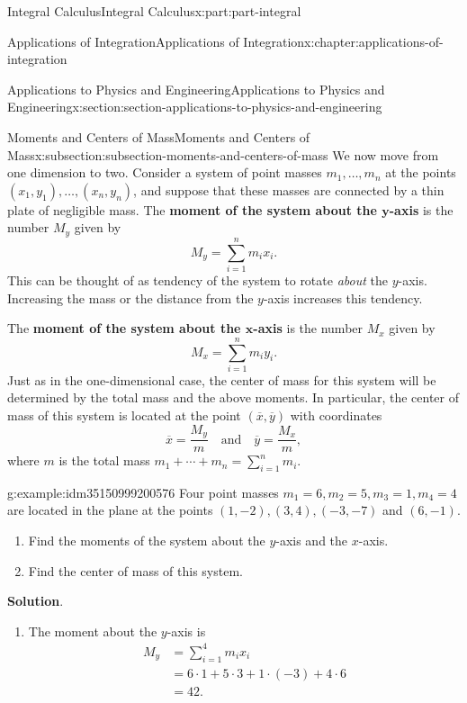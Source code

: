 \documentclass[twoside,10pt,]{tufte-book}
\newcommand{\blocktitlefont}{\relax}
\newcommand{\terminology}[1]{\textbf{#1}}
\numberwithin{equation}{part}
\newcommand{\amp}{&}
\begin{document}
\begin{partptx}{Integral Calculus}{}{Integral Calculus}{}{}{x:part:part-integral}
\begin{chapterptx}{Applications of Integration}{}{Applications of Integration}{}{}{x:chapter:applications-of-integration}
\begin{sectionptx}{Applications to Physics and Engineering}{}{Applications to Physics and Engineering}{}{}{x:section:section-applications-to-physics-and-engineering}
\begin{subsectionptx}{Moments and Centers of Mass}{}{Moments and Centers of Mass}{}{}{x:subsection:subsection-moments-and-centers-of-mass}
We now move from one dimension to two. Consider a system of point masses \(m_{1},\ldots,m_{n}\) at the points \((x_{1},y_{1}),\ldots,(x_{n},y_{n})\), and suppose that these masses are connected by a thin plate of negligible mass. The \terminology{moment of the system about the \(\boldsymbol{y}\)-axis} is the number \(M_{y}\) given by%
%
\begin{equation*}
M_{y} = \sum_{i=1}^{n}m_{i}x_{i}.
\end{equation*}
This can be thought of as tendency of the system to rotate \emph{about} the \(y\)-axis. Increasing the mass or the distance from the \(y\)-axis increases this tendency.%
\par
The \terminology{moment of the system about the \(\boldsymbol{x}\)-axis} is the number \(M_{x}\) given by%
\begin{equation*}
M_{x} = \sum_{i=1}^{n}m_{i}y_{i}.
\end{equation*}
Just as in the one-dimensional case, the center of mass for this system will be determined by the total mass and the above moments. In particular, the center of mass of this system is located at the point \((\overline{x},\overline{y})\) with coordinates%
\begin{equation*}
\overline{x} = \frac{M_{y}}{m}\quad\text{and}\quad\overline{y} = \frac{M_{x}}{m},
\end{equation*}
where \(m\) is the total mass \(m_{1}+\cdots+m_{n} = \sum_{i=1}^{n}m_{i}\).%
\begin{example}{}{g:example:idm35150999200576}%
Four point masses \(m_{1} = 6,m_{2} = 5,m_{3} = 1,m_{4} = 4\) are located in the plane at the points \((1,-2),(3,4),(-3,-7)\) and \((6,-1)\).%
\begin{enumerate}
\item{}Find the moments of the system about the \(y\)-axis and the \(x\)-axis.%
\item{}Find the center of mass of this system.%
\end{enumerate}
%
\par\smallskip%
\noindent\textbf{\blocktitlefont Solution}.\hypertarget{g:solution:idm35150999197120}{}\quad{}%
\begin{enumerate}
\item{}The moment about the \(y\)-axis is%
\begin{align*}
M_{y}\amp= \sum_{i=1}^{4}m_{i}x_{i}\\
\amp= 6\cdot1+5\cdot3+1\cdot(-3)+4\cdot6\\
\amp= 42.
\end{align*}

\end{enumerate}
\end{example}
\end{subsectionptx}
\end{sectionptx}
\end{chapterptx}
\end{partptx}
\end{document}
